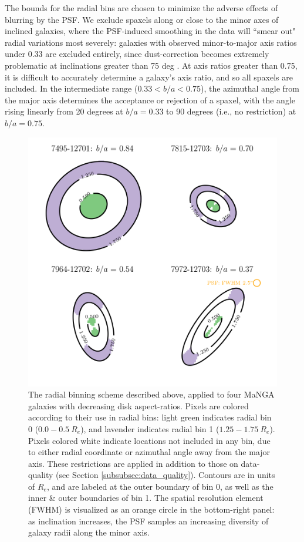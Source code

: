 The bounds for the radial bins are chosen to minimize the adverse effects of blurring by the PSF. We exclude spaxels along or close to the minor axes of inclined galaxies, where the PSF-induced smoothing in the data will ``smear out" radial variations most severely: galaxies with observed minor-to-major axis ratios under 0.33 are excluded entirely, since dust-correction becomes extremely problematic at inclinations greater than 75 deg \citep{pellegrini_2019_warpfield}. At axis ratios greater than 0.75, it is difficult to accurately determine a galaxy's axis ratio, and so all spaxels are included. In the intermediate range ($0.33 < b/a < 0.75$), the azimuthal angle from the major axis determines the acceptance or rejection of a spaxel, with the angle rising linearly from 20 degrees at $b/a = 0.33$ to 90 degrees (i.e., no restriction) at $b/a = 0.75$.

\begin{figure}
    \centering
    \includegraphics[width=5 in]{radial_bins}
    \caption[An illustration of the radial binning scheme used to compute radial metallicity decrements, along with azimuthal cuts excluding the minor axis.]{\fixspacing The radial binning scheme described above, applied to four MaNGA galaxies with decreasing disk aspect-ratios. Pixels are colored according to their use in radial bins: light green indicates radial bin 0 ($0.0 - 0.5~R_e$), and lavender indicates radial bin 1 ($1.25-1.75~R_e$). Pixels colored white indicate locations not included in any bin, due to either radial coordinate or azimuthal angle away from the major axis. These restrictions are applied in addition to those on data-quality (see Section \ref{subsubsec:data_quality}). Contours are in units of $R_e$, and are labeled at the outer boundary of bin 0, as well as the inner \& outer boundaries of bin 1. The spatial resolution element (FWHM) is visualized as an orange circle in the bottom-right panel: as inclination increases, the PSF samples an increasing diversity of galaxy radii along the minor axis.}
    \label{fig:radial_bins}
\end{figure}

